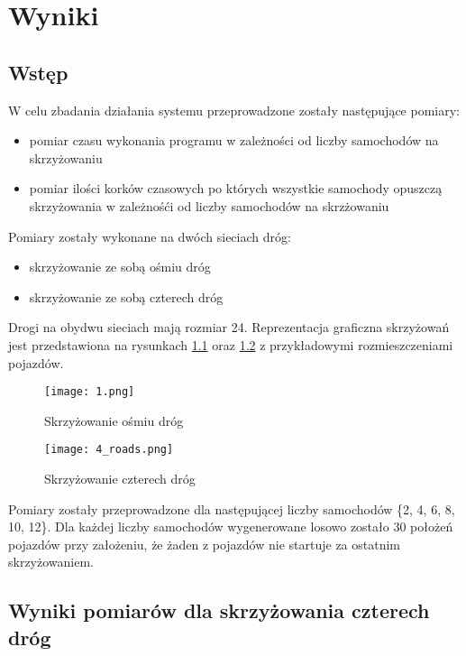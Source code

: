 \chapter{Wyniki} \label{chap:outcomes}

\section{Wstęp}

W celu zbadania działania systemu przeprowadzone zostały następujące pomiary:

\begin{itemize}
\item pomiar czasu wykonania programu w zależności od liczby samochodów na skrzyżowaniu 
\item pomiar ilości korków czasowych po których wszystkie samochody opuszczą skrzyżowania w zależnośći od liczby samochodów na skrzżowaniu
\end{itemize}

Pomiary zostały wykonane na dwóch sieciach dróg:
\begin{itemize}
\item skrzyżowanie ze sobą ośmiu dróg
\item skrzyżowanie ze sobą czterech dróg
\end{itemize}

Drogi na obydwu sieciach mają rozmiar 24.
\newline
\newline
Reprezentacja graficzna skrzyżowań jest przedstawiona na rysunkach \ref{eight-roads-crossroads} oraz \ref{four-roads-crossroads} z przykładowymi rozmieszczeniami pojazdów.
\begin{figure}
    \texttt{[image: 1.png]}
  \caption{Skrzyżowanie ośmiu dróg}
  \label{eight-roads-crossroads}
\end{figure}
\begin{figure}
    \texttt{[image: 4\_roads.png]}
  \caption{Skrzyżowanie czterech dróg}
  \label{four-roads-crossroads}
\end{figure}

Pomiary zostały przeprowadzone dla następującej liczby samochodów \{2, 4, 6, 8, 10, 12\}.
\newline
\newline
Dla każdej liczby samochodów wygenerowane losowo zostało 30 położeń pojazdów przy założeniu, że żaden z pojazdów nie startuje za ostatnim skrzyżowaniem.

\section{Wyniki pomiarów dla skrzyżowania czterech dróg}

